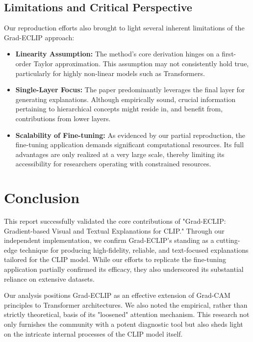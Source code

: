 \documentclass[10pt]{article} %
\begin{document}
\subsection{Limitations and Critical Perspective}

Our reproduction efforts also brought to light several inherent limitations of the Grad-ECLIP approach:
\begin{itemize}
    \item \textbf{Linearity Assumption:} The method's core derivation hinges on a first-order Taylor approximation. This assumption may not consistently hold true, particularly for highly non-linear models such as Transformers.
    \item \textbf{Single-Layer Focus:} The paper predominantly leverages the final layer for generating explanations. Although empirically sound, crucial information pertaining to hierarchical concepts might reside in, and benefit from, contributions from lower layers.
    \item \textbf{Scalability of Fine-tuning:} As evidenced by our partial reproduction, the fine-tuning application demands significant computational resources. Its full advantages are only realized at a very large scale, thereby limiting its accessibility for researchers operating with constrained resources.
\end{itemize}

\section{Conclusion}

This report successfully validated the core contributions of "Grad-ECLIP: Gradient-based Visual and Textual Explanations for CLIP." Through our independent implementation, we confirm Grad-ECLIP's standing as a cutting-edge technique for producing high-fidelity, reliable, and text-focused explanations tailored for the CLIP model. While our efforts to replicate the fine-tuning application partially confirmed its efficacy, they also underscored its substantial reliance on extensive datasets.

Our analysis positions Grad-ECLIP as an effective extension of Grad-CAM principles to Transformer architectures. We also noted the empirical, rather than strictly theoretical, basis of its "loosened" attention mechanism. This research not only furnishes the community with a potent diagnostic tool but also sheds light on the intricate internal processes of the CLIP model itself.
\end{document}
